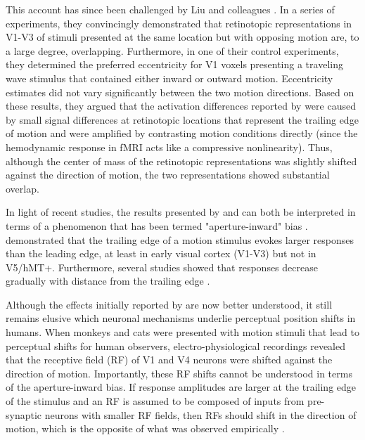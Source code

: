 This account has since been challenged by Liu and colleagues \parencite*{Liu2006}. In a series of experiments, they convincingly demonstrated that retinotopic representations in V1-V3 of stimuli presented at the same location but with opposing motion are, to a large degree, overlapping. Furthermore, in one of their control experiments, they determined the preferred eccentricity for V1 voxels presenting a traveling wave stimulus that contained either inward or outward motion. Eccentricity estimates did not vary significantly between the two motion directions. Based on these results, they argued that the activation differences reported by \cite{Whitney2003} were caused by small signal differences at retinotopic locations that represent the trailing edge of motion and were amplified by contrasting motion conditions directly (since the hemodynamic response in fMRI acts like a compressive nonlinearity). Thus, although the center of mass of the retinotopic representations was slightly shifted against the direction of motion, the two representations showed substantial overlap.

In light of recent studies, the results presented by \cite{Whitney2003} and \cite{Liu2006} can both be interpreted in terms of a phenomenon that has been termed "aperture-inward" bias \parencite{Wang2014}. \cite{Wang2014} demonstrated that the trailing edge of a motion stimulus evokes larger responses than the leading edge, at least in early visual cortex (V1-V3) but not in V5/hMT+. Furthermore, several studies showed that responses decrease gradually with distance from the trailing edge \parencite{Wang2014, Schellekens2015, Schellekens2016}.

Although the effects initially reported by \cite{Whitney2003} are now better understood, it still remains elusive which neuronal mechanisms underlie perceptual position shifts in humans. When monkeys and cats were presented with motion stimuli that lead to perceptual shifts for human observers, electro-physiological recordings revealed that the receptive field (RF) of V1 \parencite{Fu2004} and V4 \parencite{Sundberg2006} neurons were shifted against the direction of motion. Importantly, these RF shifts cannot be understood in terms of the aperture-inward bias. If response amplitudes are larger at the trailing edge of the stimulus and an RF is assumed to be composed of inputs from pre-synaptic neurons with smaller RF fields, then RFs should shift in the direction of motion, which is the opposite of what was observed empirically \parencite{Fu2004}.

